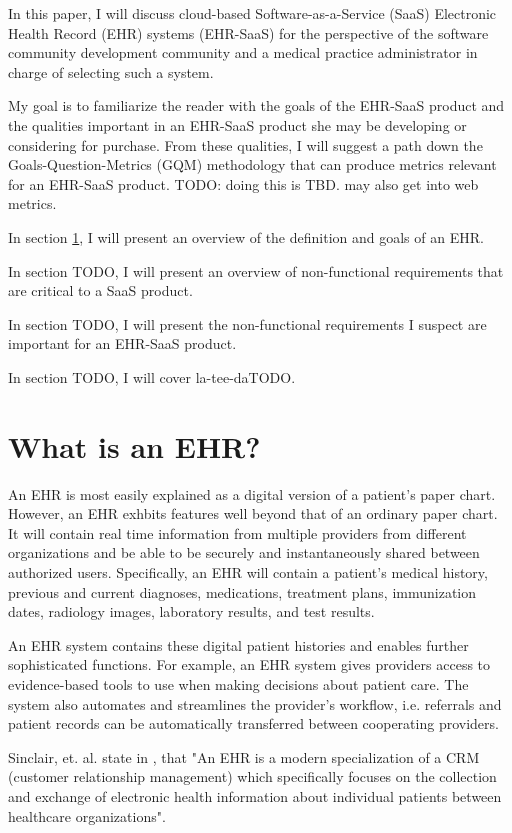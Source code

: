 \documentclass[10pt]{article}
\begin{document}
In this paper, I will discuss cloud-based Software-as-a-Service (SaaS) Electronic Health Record (EHR) systems (EHR-SaaS) for the perspective
of the software community development community and a medical practice administrator in charge of selecting such a system.

My goal is to familiarize the reader with the goals of the EHR-SaaS product and the qualities important in an EHR-SaaS product
she may be developing or considering for purchase.
From these qualities, I will suggest a path down the Goals-Question-Metrics (GQM) methodology that can produce metrics relevant for an EHR-SaaS product.
TODO: doing this is TBD. may also get into web metrics.

In section \ref{sec:What is an EHR}, I will present an overview of the definition and goals of an EHR.

In section TODO, I will present an overview of non-functional requirements that are critical to a SaaS product.

In section TODO, I will present the non-functional requirements I suspect are important for an EHR-SaaS product.

In section TODO, I will cover la-tee-daTODO.

\section{What is an EHR?}
\label{sec:What is an EHR}

An EHR is most easily explained as a digital version of a patient's paper chart.
However, an EHR exhbits features well beyond that of an ordinary paper chart.
It will contain real time information from multiple providers from different organizations and be able to be securely and instantaneously shared between authorized users.
Specifically, an EHR will contain a patient's medical history, previous and current diagnoses, medications, treatment plans, immunization dates, radiology images, laboratory results, and test results.

An EHR system contains these digital patient histories and enables further sophisticated functions.
For example, an EHR system gives providers access to evidence-based tools to use when making decisions about patient care.
The system also automates and streamlines the provider's workflow, i.e. referrals and patient records can be automatically transferred between cooperating providers.
\cite{healthit-ehr}

Sinclair, et. al. state in \cite{auditingprivacy}, that "An EHR is a modern specialization of a CRM (customer relationship management) which specifically focuses on the collection and exchange of electronic health information about individual patients between healthcare organizations".
\end{document}
